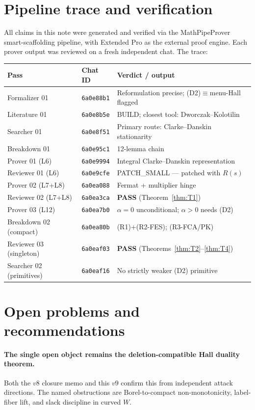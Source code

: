 \documentclass[11pt]{article}
\theoremstyle{definition}
\theoremstyle{remark}
\begin{document}
\section{Pipeline trace and verification}\label{sec:pipeline}

All claims in this note were generated and verified via the
MathPipeProver smart-scaffolding pipeline, with Extended Pro as the
external proof engine. Each prover output was reviewed on a fresh
independent chat. The trace:

\begin{center}
\begin{tabular}{|l|l|l|}
\hline
Pass & Chat ID & Verdict / output \\
\hline
Formalizer 01 & \texttt{6a0e88b1} & Reformulation precise; (D2)$\equiv$menu-Hall flagged \\
Literature 01 & \texttt{6a0e8b5e} & BUILD; closest tool: Dworczak--Kolotilin \\
Searcher 01 & \texttt{6a0e8f51} & Primary route: Clarke--Danskin stationarity \\
Breakdown 01 & \texttt{6a0e95c1} & 12-lemma chain \\
Prover 01 (L6) & \texttt{6a0e9994} & Integral Clarke--Danskin representation \\
Reviewer 01 (L6) & \texttt{6a0e9cfe} & PATCH\_SMALL --- patched with $R(s)$ \\
Prover 02 (L7+L8) & \texttt{6a0ea088} & Fermat + multiplier hinge \\
Reviewer 02 (L7+L8) & \texttt{6a0ea3ca} & \textbf{PASS} (Theorem~\ref{thm:T1}) \\
Prover 03 (L12) & \texttt{6a0ea7b0} & $\alpha=0$ unconditional; $\alpha>0$ needs (D2) \\
Breakdown 02 (compact) & \texttt{6a0ea80b} & (R1)+(R2-FES); (R3-FCA/PK) \\
Reviewer 03 (singleton) & \texttt{6a0eaf03} & \textbf{PASS} (Theorems~\ref{thm:T2}--\ref{thm:T4}) \\
Searcher 02 (primitives) & \texttt{6a0eaf16} & No strictly weaker (D2) primitive \\
\hline
\end{tabular}
\end{center}

\section{Open problems and recommendations}\label{sec:open}

\paragraph{The single open object remains the deletion-compatible Hall
duality theorem.} Both the $v8$ closure memo and this $v9$ confirm
this from independent attack directions. The named obstructions are
Borel-to-compact non-monotonicity, label-fiber lift, and slack
discipline in curved $W$.
\end{document}
